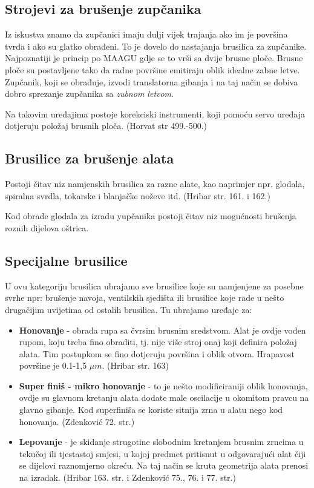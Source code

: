 \documentclass[a4paper,12pt]{article}
\numberwithin{figure}{section}
\begin{document}
\subsection{Strojevi za brušenje zupčanika}
Iz iskustva znamo da zupčanici imaju dulji vijek trajanja ako im je površina tvrđa i ako su glatko obrađeni. To je dovelo do nastajanja brusilica za zupčanike. Najpoznatiji je princip po MAAGU gdje se to vrši sa dvije brusne ploče. Brusne ploče su postavljene tako da radne površine emitiraju oblik idealne zabne letve. Zupčanik, koji se obrađuje, izvodi translatorna gibanja i na taj način se dobiva dobro sprezanje zupčanika sa \textit{zubnom letvom}. \par 
Na takovim uređajima postoje korekciski instrumenti, koji pomoću servo uređaja dotjeruju položaj brusnih ploča. (Horvat str 499.-500.)
\subsection{Brusilice za brušenje alata}
Postoji čitav niz namjenskih brusilica za razne alate, kao naprimjer npr. glodala, spiralna svrdla, tokarske i blanjačke noževe itd. (Hribar str. 161. i 162.)\par
Kod obrade glodala za izradu yupčanika postoji čitav niz mogućnosti brušenja roznih dijelova oštrica.
\subsection{Specijalne brusilice}
U ovu kategoriju brusilica ubrajamo sve brusilice koje su namjenjene za posebne svrhe npr: brušenje navoja, ventilskih sjedišta ili brusilice koje rade u nešto drugačijim uvijetima od ostalih brusilica. Tu ubrajamo uređaje za:
\begin{itemize}
\item \textbf{Honovanje} - obrada rupa sa čvrsim brusnim sredstvom. Alat je ovdje vođen rupom, koju treba fino obraditi, tj. nije više stroj onaj koji definira položaj alata. Tim postupkom se fino dotjeruju površina i oblik otvora. Hrapavost površine je 0.1-1,5 $\mu m$. (Hribar str. 163)
\item \textbf{Super finiš - mikro honovanje} - to je nešto modificiraniji oblik honovanja, ovdje su glavnom kretanju alata dodate male oscilacije u okomitom pravcu na glavno gibanje. Kod superfiniša se koriste sitnija zrna u alatu nego kod honovanja. (Zdenković 72. str.)
\item \textbf{Lepovanje} - je skidanje strugotine slobodnim kretanjem brusnim zrncima u tekučoj ili tjestastoj smjesi, u kojoj predmet pritisnut u odgovarajući alat čiji se dijelovi raznomjerno okreću. Na taj način se kruta geometrija alata prenosi na izradak. (Hribar 163. str. i Zdenković 75., 76. i 77. str.)
\end{itemize}
\end{document}
